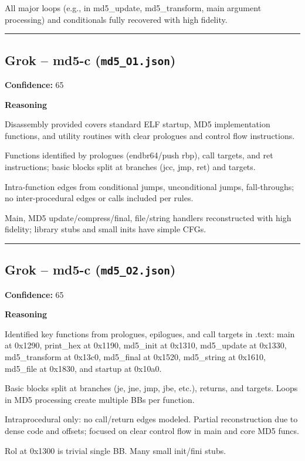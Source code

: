 All major loops (e.g., in md5\_update, md5\_transform, main argument processing) and conditionals fully recovered with high fidelity.

\bigskip
\hrule
\bigskip

\subsection{Grok -- md5-c (\texttt{md5\_O1.json})}

\textbf{Confidence:} 65

\textbf{Reasoning}

Disassembly provided covers standard ELF startup, MD5 implementation functions, and utility routines with clear prologues and control flow instructions.

Functions identified by prologues (endbr64/push rbp), call targets, and ret instructions; basic blocks split at branches (jcc, jmp, ret) and targets.

Intra-function edges from conditional jumps, unconditional jumps, fall-throughs; no inter-procedural edges or calls included per rules.

Main, MD5 update/compress/final, file/string handlers reconstructed with high fidelity; library stubs and small inits have simple CFGs.

\bigskip
\hrule
\bigskip

\subsection{Grok -- md5-c (\texttt{md5\_O2.json})}

\textbf{Confidence:} 65

\textbf{Reasoning}

Identified key functions from prologues, epilogues, and call targets in .text: main at 0x1290, print\_hex at 0x1190, md5\_init at 0x1310, md5\_update at 0x1330, md5\_transform at 0x13c0, md5\_final at 0x1520, md5\_string at 0x1610, md5\_file at 0x1830, and startup at 0x10a0.

Basic blocks split at branches (je, jne, jmp, jbe, etc.), returns, and targets. Loops in MD5 processing create multiple BBs per function.

Intraprocedural only: no call/return edges modeled. Partial reconstruction due to dense code and offsets; focused on clear control flow in main and core MD5 funcs.

Rol at 0x1300 is trivial single BB. Many small init/fini stubs.

